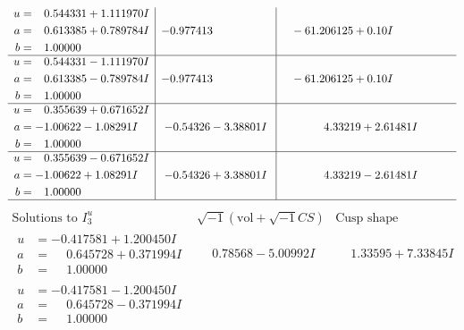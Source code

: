 \documentclass[1p]{elsarticle_modified}
\theoremstyle{definition}
\newcommand{\I}{\sqrt{-1}}
\begin{document}
$$\begin{array}{c|c|c}
\begin{aligned}
u &= \phantom{-}0.544331 + 1.111970 I \\
a &= \phantom{-}0.613385 + 0.789784 I \\
b &= \phantom{-}1.00000\phantom{ +0.000000I}\end{aligned}
 & -0.977413\phantom{ +0.000000I} & \phantom{-}                -6
1.206125 + 0. 10   I\phantom{ +0.000000I} \\ \hline\begin{aligned}
u &= \phantom{-}0.544331 - 1.111970 I \\
a &= \phantom{-}0.613385 - 0.789784 I \\
b &= \phantom{-}1.00000\phantom{ +0.000000I}\end{aligned}
 & -0.977413\phantom{ +0.000000I} & \phantom{-}                -6
1.206125 + 0. 10   I\phantom{ +0.000000I} \\ \hline\begin{aligned}
u &= \phantom{-}0.355639 + 0.671652 I \\
a &= -1.00622 - 1.08291 I \\
b &= \phantom{-}1.00000\phantom{ +0.000000I}\end{aligned}
 & -0.54326 - 3.38801 I & \phantom{-}4.33219 + 2.61481 I \\ \hline\begin{aligned}
u &= \phantom{-}0.355639 - 0.671652 I \\
a &= -1.00622 + 1.08291 I \\
b &= \phantom{-}1.00000\phantom{ +0.000000I}\end{aligned}
 & -0.54326 + 3.38801 I & \phantom{-}4.33219 - 2.61481 I\\
 \hline 
 \end{array}$$\newpage$$\begin{array}{c|c|c}  
\text{Solutions to }I^u_{3}& \I (\text{vol} + \sqrt{-1}CS) & \text{Cusp shape}\\
 \hline 
\begin{aligned}
u &= -0.417581 + 1.200450 I \\
a &= \phantom{-}0.645728 + 0.371994 I \\
b &= \phantom{-}1.00000\phantom{ +0.000000I}\end{aligned}
 & \phantom{-}0.78568 - 5.00992 I & \phantom{-}1.33595 + 7.33845 I \\ \hline\begin{aligned}
u &= -0.417581 - 1.200450 I \\
a &= \phantom{-}0.645728 - 0.371994 I \\
b &= \phantom{-}1.00000\phantom{ +0.000000I}\end{aligned}

\end{array}$$
\end{document}
